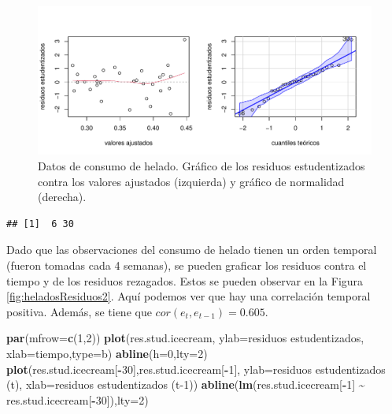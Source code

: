 \documentclass[
]{article}
\newenvironment{Shaded}{\begin{snugshade}}{\end{snugshade}}
\newcommand{\AttributeTok}[1]{\textcolor[rgb]{0.13,0.29,0.53}{#1}}
\newcommand{\DecValTok}[1]{\textcolor[rgb]{0.00,0.00,0.81}{#1}}
\newcommand{\FunctionTok}[1]{\textcolor[rgb]{0.13,0.29,0.53}{\textbf{#1}}}
\newcommand{\NormalTok}[1]{#1}
\newcommand{\SpecialCharTok}[1]{\textcolor[rgb]{0.81,0.36,0.00}{\textbf{#1}}}
\newcommand{\StringTok}[1]{\textcolor[rgb]{0.31,0.60,0.02}{#1}}
\begin{document}
\begin{figure}

{\centering \includegraphics{MLG1_files/figure-latex/heladosResiduos1-1} 

}

\caption{Datos de consumo de helado. Gráfico de los residuos estudentizados contra los valores ajustados (izquierda) y gráfico de normalidad (derecha).}\label{fig:heladosResiduos1}
\end{figure}

\begin{verbatim}
## [1]  6 30
\end{verbatim}

Dado que las observaciones del consumo de helado tienen un orden temporal (fueron tomadas cada 4 semanas), se pueden graficar los residuos contra el tiempo y de los residuos rezagados. Estos se pueden observar en la Figura \ref{fig:heladosResiduos2}. Aquí podemos ver que hay una correlación temporal positiva. Además, se tiene que \(cor(e_{t},e_{t-1}) = 0.605\).

\begin{Shaded}
\begin{Highlighting}[]
\FunctionTok{par}\NormalTok{(}\AttributeTok{mfrow=}\FunctionTok{c}\NormalTok{(}\DecValTok{1}\NormalTok{,}\DecValTok{2}\NormalTok{))}
\FunctionTok{plot}\NormalTok{(res.stud.icecream, }\AttributeTok{ylab=}\StringTok{\textquotesingle{}residuos estudentizados\textquotesingle{}}\NormalTok{,}
     \AttributeTok{xlab=}\StringTok{\textquotesingle{}tiempo\textquotesingle{}}\NormalTok{,}\AttributeTok{type=}\StringTok{\textquotesingle{}b\textquotesingle{}}\NormalTok{)}
\FunctionTok{abline}\NormalTok{(}\AttributeTok{h=}\DecValTok{0}\NormalTok{,}\AttributeTok{lty=}\DecValTok{2}\NormalTok{)}
\FunctionTok{plot}\NormalTok{(res.stud.icecream[}\SpecialCharTok{{-}}\DecValTok{30}\NormalTok{],res.stud.icecream[}\SpecialCharTok{{-}}\DecValTok{1}\NormalTok{], }\AttributeTok{ylab=}\StringTok{\textquotesingle{}residuos estudentizados (t)\textquotesingle{}}\NormalTok{,}
     \AttributeTok{xlab=}\StringTok{\textquotesingle{}residuos estudentizados (t{-}1)\textquotesingle{}}\NormalTok{)}
\FunctionTok{abline}\NormalTok{(}\FunctionTok{lm}\NormalTok{(res.stud.icecream[}\SpecialCharTok{{-}}\DecValTok{1}\NormalTok{] }\SpecialCharTok{\textasciitilde{}}\NormalTok{ res.stud.icecream[}\SpecialCharTok{{-}}\DecValTok{30}\NormalTok{]),}\AttributeTok{lty=}\DecValTok{2}\NormalTok{)}
\end{Highlighting}
\end{Shaded}
\end{document}
